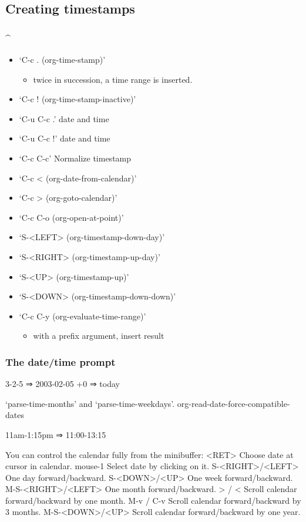 \documentclass[11pt]{article}
\begin{document}
\subsection{Creating timestamps}
\label{sec:orgbd5119a}
\subsubsection{\^{}}
\label{sec:org5b89c34}
\begin{itemize}
\item ‘C-c .     (org-time-stamp)’
\begin{itemize}
\item twice in succession, a time range is inserted.
\end{itemize}
\item ‘C-c !     (org-time-stamp-inactive)’
\item ‘C-u C-c .’ date and time
\item ‘C-u C-c !’ date and time
\item ‘C-c C-c’ Normalize timestamp
\item ‘C-c <     (org-date-from-calendar)’
\item ‘C-c >     (org-goto-calendar)’
\item ‘C-c C-o     (org-open-at-point)’
\item ‘S-<LEFT>     (org-timestamp-down-day)’
\item ‘S-<RIGHT>     (org-timestamp-up-day)’
\item ‘S-<UP>     (org-timestamp-up)’
\item ‘S-<DOWN>     (org-timestamp-down-down)’
\item ‘C-c C-y     (org-evaluate-time-range)’
\begin{itemize}
\item with a prefix argument, insert result
\end{itemize}
\end{itemize}
\subsubsection{The date/time prompt}
\label{sec:org54dd5ee}
3-2-5         ⇒ 2003-02-05
+0            ⇒ today

‘parse-time-months’ and ‘parse-time-weekdays’.
org-read-date-force-compatible-dates

11am-1:15pm    ⇒ 11:00-13:15

You can control the calendar fully from the minibuffer:
     <RET>              Choose date at cursor in calendar.
     mouse-1            Select date by clicking on it.
     S-<RIGHT>/<LEFT>   One day forward/backward.
     S-<DOWN>/<UP>      One week forward/backward.
     M-S-<RIGHT>/<LEFT> One month forward/backward.
     > / <              Scroll calendar forward/backward by one month.
     M-v / C-v          Scroll calendar forward/backward by 3 months.
     M-S-<DOWN>/<UP>    Scroll calendar forward/backward by one year.
\end{document}
